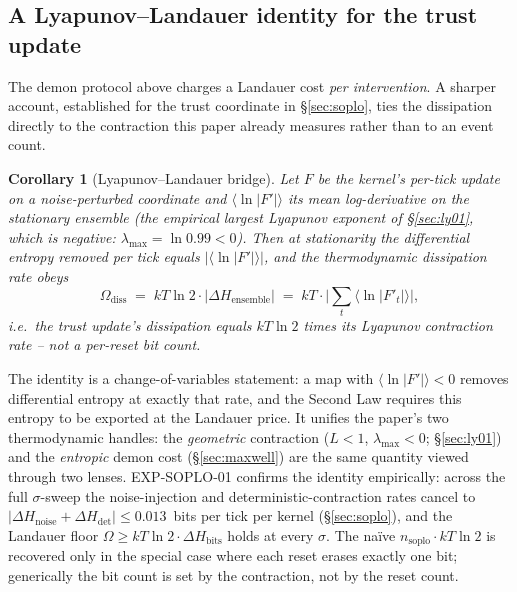 \documentclass[11pt, a4paper]{article}
\newtheorem{corollary}[theorem]{Corollary}
\begin{document}
\subsection{A Lyapunov--Landauer identity for the trust update}

The demon protocol above charges a Landauer cost \emph{per intervention}. A
sharper account, established for the trust coordinate in \S\ref{sec:soplo}, ties
the dissipation directly to the contraction this paper already measures rather
than to an event count.

\begin{corollary}[Lyapunov--Landauer bridge]
\label{cor:lyaplandauer}
Let $F$ be the kernel's per-tick update on a noise-perturbed coordinate and
$\langle\ln\lvert F'\rvert\rangle$ its mean log-derivative on the stationary
ensemble (the empirical largest Lyapunov exponent of \S\ref{sec:ly01}, which is
negative: $\lambda_{\max} = \ln 0.99 < 0$). Then at stationarity the differential
entropy removed per tick equals $\lvert\langle\ln\lvert F'\rvert\rangle\rvert$,
and the thermodynamic dissipation rate obeys
\[
  \Omega_\text{diss} \;=\; kT\ln 2 \cdot \lvert \Delta H_\text{ensemble}\rvert
                      \;=\; kT \cdot \big\lvert \textstyle\sum_t \langle\ln\lvert F'_t\rvert\rangle \big\rvert,
\]
i.e.\ the trust update's dissipation equals $kT\ln 2$ times its Lyapunov
contraction rate -- not a per-reset bit count.
\end{corollary}

The identity is a change-of-variables statement: a map with $\langle\ln\lvert
F'\rvert\rangle < 0$ removes differential entropy at exactly that rate, and the
Second Law requires this entropy to be exported at the Landauer price. It unifies
the paper's two thermodynamic handles: the \emph{geometric} contraction ($L<1$,
$\lambda_{\max}<0$; \S\ref{sec:ly01}) and the \emph{entropic} demon cost
(\S\ref{sec:maxwell}) are the same quantity viewed through two lenses.
EXP-SOPLO-01 confirms the identity empirically: across the full $\sigma$-sweep the
noise-injection and deterministic-contraction rates cancel to
$\lvert \Delta H_\text{noise} + \Delta H_\text{det}\rvert \le 0.013$~bits per tick
per kernel (\S\ref{sec:soplo}), and the Landauer floor $\Omega \ge kT\ln 2 \cdot
\Delta H_\text{bits}$ holds at every $\sigma$. The naïve $n_\text{soplo}\cdot
kT\ln 2$ is recovered only in the special case where each reset erases exactly one
bit; generically the bit count is set by the contraction, not by the reset count.

\FloatBarrier
\end{document}
